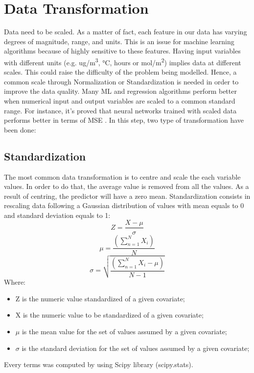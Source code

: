 \section{Data Transformation}
Data need to be scaled. As a matter of fact, each feature in our data has varying degrees of magnitude, range, and units. This is an issue for machine learning algorithms because of highly sensitive to these features. 
Having input variables with different units (e.g. ug/m\textsuperscript{3}, °C, hours or mol/m\textsuperscript{2}) implies data at different scales. This could raise the difficulty of the problem being modelled. \newline
Hence, a common scale through Normalization or Standardization is needed in order to improve the data quality.\newline
Many ML and regression algorithms perform better when numerical input and output variables are scaled to a common standard range. \newline
For instance, it's proved that neural networks trained with scaled data performs better in terms of MSE \cite{shanker1996effect}.
In this step, two type of transformation have been done:
\subsection{Standardization}
The most common data transformation is to centre and scale the each variable values. In order to do that, the average value is removed from all the values. As a result of centring, the predictor will have a zero mean.\cite{kuhn2013applied}
Standardization consists in rescaling data following a Gaussian distribution of values with mean equals to 0 and standard deviation equals to 1:
\begin{equation}
  Z = \frac{X-\mu}{\sigma}
\end{equation}
\begin{equation}
\mu = \frac{(\sum_{n=1}^{N} X_i)}{N}
\end{equation}
\begin{equation}
\sigma = \sqrt{\frac{(\sum_{n=1}^{N} X_i-\mu)}{N-1}}
\end{equation}
Where:
\begin{itemize}
\item Z is the numeric value standardized of a given covariate;
\item X is the numeric value to be standardized of a given covariate;
\item $\mu$ is the mean value for the set of values assumed by a given covariate;
\item $\sigma$ is the standard deviation for the set of values assumed by a given covariate;
\end{itemize}
Every terms was computed by using Scipy library (scipy.stats). 
\bigbreak
